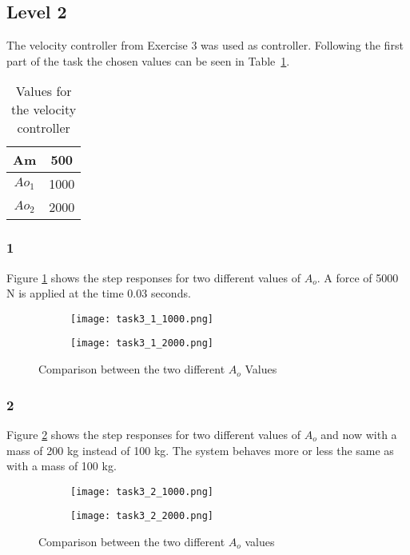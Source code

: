 \subsection*{Level 2}
The velocity controller from Exercise 3 was used as controller.
Following the first part of the task the chosen values can be seen in
Table~\ref{tbl:table2}.

\begin{table}[H]
  \centering
    \caption{Values for the velocity controller}
    \begin{tabular}{| c | c |}
		\hline
		Am & 500 \\ \hline
		$Ao_1$ & 1000 \\ \hline
		$Ao_2$ & 2000 \\
		\hline
    \end{tabular}
    \label{tbl:table2}
\end{table}

\subsubsection*{1}
Figure \ref{fig:task3_1_1000} shows the step responses for two different
values of $A_o$. A force of 5000 N is applied at the time 0.03 seconds.

\begin{figure}[H]
    \centering
    \begin{subfigure}[b]{0.45\textwidth}
        \texttt{[image: task3\_1\_1000.png]}
    \end{subfigure}
    \begin{subfigure}[b]{0.45\textwidth}
        \texttt{[image: task3\_1\_2000.png]}
    \end{subfigure}
	\caption{Comparison between the two different $A_o$ Values}
	\label{fig:task3_1_1000}
\end{figure}

\subsubsection*{2}
Figure \ref{fig:task3_2_1000} shows the step responses for two different
values of $A_o$ and now with a mass of 200 kg instead of 100 kg. The system
behaves more or less the same as with a mass of 100 kg.

\begin{figure}[H]
    \centering
    \begin{subfigure}[b]{0.45\textwidth}
        \texttt{[image: task3\_2\_1000.png]}
    \end{subfigure}
    \begin{subfigure}[b]{0.45\textwidth}
        \texttt{[image: task3\_2\_2000.png]}
    \end{subfigure}
	\caption{Comparison between the two different $A_o$ values}
	\label{fig:task3_2_1000}
\end{figure}

